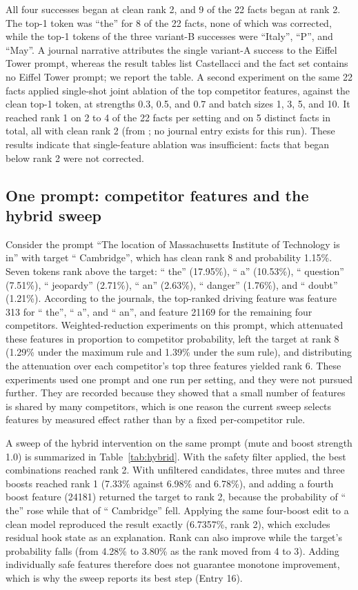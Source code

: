 \documentclass[conference]{IEEEtran}
\newcommand{\code}[1]{\texttt{\detokenize{#1}}}
\begin{document}
All four successes began at clean rank 2, and 9 of the 22 facts began at rank 2. The top-1 token was ``the'' for 8 of the 22 facts, none of which was corrected, while the top-1 tokens of the three variant-B successes were ``Italy'', ``P'', and ``May''. A journal narrative attributes the single variant-A success to the Eiffel Tower prompt, whereas the result tables list Castellacci and the fact set contains no Eiffel Tower prompt; we report the table. A second experiment on the same 22 facts applied single-shot joint ablation of the top competitor features, against the clean top-1 token, at strengths 0.3, 0.5, and 0.7 and batch sizes 1, 3, 5, and 10. It reached rank 1 on 2 to 4 of the 22 facts per setting and on 5 distinct facts in total, all with clean rank 2 (from \code{outputs/stage_1/grid_sweep_results.csv}; no journal entry exists for this run). These results indicate that single-feature ablation was insufficient: facts that began below rank 2 were not corrected.

\subsection{One prompt: competitor features and the hybrid sweep}
\label{sec:cambridge}
Consider the prompt ``The location of Massachusetts Institute of Technology is in'' with target `` Cambridge'', which has clean rank 8 and probability 1.15\%. Seven tokens rank above the target: `` the'' (17.95\%), `` a'' (10.53\%), `` question'' (7.51\%), `` jeopardy'' (2.71\%), `` an'' (2.63\%), `` danger'' (1.76\%), and `` doubt'' (1.21\%). According to the journals, the top-ranked driving feature was feature 313 for `` the'', `` a'', and `` an'', and feature 21169 for the remaining four competitors. Weighted-reduction experiments on this prompt, which attenuated these features in proportion to competitor probability, left the target at rank 8 (1.29\% under the maximum rule and 1.39\% under the sum rule), and distributing the attenuation over each competitor's top three features yielded rank 6. These experiments used one prompt and one run per setting, and they were not pursued further. They are recorded because they showed that a small number of features is shared by many competitors, which is one reason the current sweep selects features by measured effect rather than by a fixed per-competitor rule.

A sweep of the hybrid intervention on the same prompt (mute and boost strength 1.0) is summarized in Table~\ref{tab:hybrid}. With the safety filter applied, the best combinations reached rank 2. With unfiltered candidates, three mutes and three boosts reached rank 1 (7.33\% against 6.98\% and 6.78\%), and adding a fourth boost feature (24181) returned the target to rank 2, because the probability of `` the'' rose while that of `` Cambridge'' fell. Applying the same four-boost edit to a clean model reproduced the result exactly (6.7357\%, rank 2), which excludes residual hook state as an explanation. Rank can also improve while the target's probability falls (from 4.28\% to 3.80\% as the rank moved from 4 to 3). Adding individually safe features therefore does not guarantee monotone improvement, which is why the sweep reports its best step (Entry 16).
\end{document}
